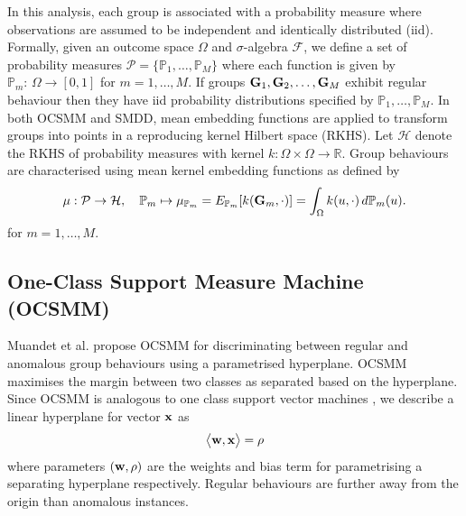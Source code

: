  In this analysis, each  group   is associated with a probability measure where observations  are assumed to be  independent and identically distributed (iid). 
Formally, %
given an  outcome space $\Omega$ and $\sigma$-algebra $\mathcal{F}$, we define a set of probability measures $\mathcal{P}=\{\mathbb{P}_1,\dots,\mathbb{P}_M\}$  
where each function is given by $\mathbb{P}_m: \, \Omega \to [0,1]
$ for $m=1,\dots, M$. 
If groups  ${\bf G}_1,{\bf G}_2,\dots,{\bf G}_M$ exhibit regular behaviour then they have iid probability distributions specified by $\mathbb{P}_1,\dots,\mathbb{P}_M$.   
 In both OCSMM and SMDD, mean embedding functions are applied to transform groups into points in a reproducing kernel Hilbert space (RKHS). 
   Let $\mathcal{H}$ denote the RKHS of probability measures with   kernel $k:\Omega \times \Omega  \to\mathbb{R}$.  Group behaviours are characterised using mean kernel embedding functions as defined by 
 \begin{align}
\mu :  \mathcal{P}\to \mathcal{H}, \quad\mathbb{P}_m \mapsto \mu_{\mathbb{P}_m}=E_{\mathbb{P}_m} [ k({\bf G}_m,\cdot) ] =\int_{\Omega} k(u,\cdot)\, d\mathbb{P}_m(u).  \label{KMF}
 \end{align}
 for $m=1,\dots,M$. 
 

  

\subsection{ One-Class Support Measure Machine (OCSMM) }
 Muandet et al. \cite{OCSMM} propose OCSMM for  discriminating between regular and anomalous  group behaviours using a parametrised hyperplane. OCSMM maximises
 the margin between two classes as separated based on the hyperplane.  
{  Since OCSMM is  analogous to one class support vector machines  \cite{OCSVM}, we describe a linear hyperplane for vector ${\bf x}$ as } 
\[ %
\big\langle {\bf w}, {\bf x} \big \rangle = \rho \]
where parameters $({\bf w}, \rho)$ are the weights and bias term for parametrising a separating hyperplane respectively.  Regular behaviours are further away from  the origin than anomalous instances. 


